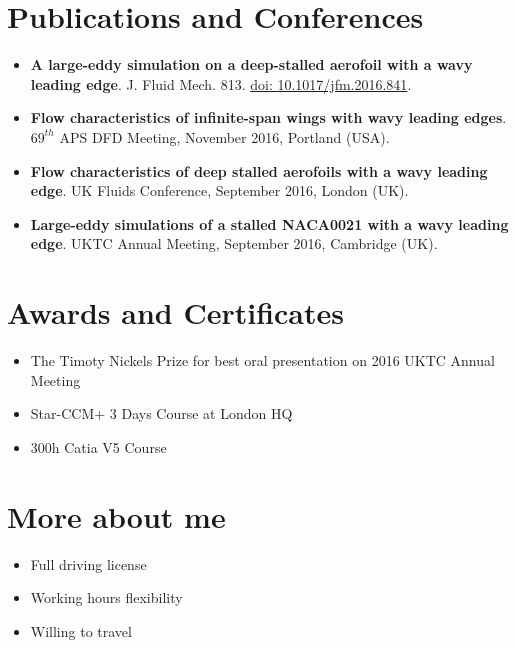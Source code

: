 \documentclass[fontsize=10pt]{tccv}
\begin{document}
\vspace{-25pt}
\section{Publications and Conferences} 
  	\begin{itemize}
	\itemsep -2pt
\item \textbf{A large-eddy simulation on a deep-stalled aerofoil with a wavy leading edge}. J. Fluid Mech. 813. \href{https://doi.org/10.1017/jfm.2016.841}{doi: 10.1017/jfm.2016.841}.
\item \textbf{Flow characteristics of infinite-span wings with wavy leading edges}. $69^{th}$ APS DFD Meeting, November 2016, Portland (USA). 
\item \textbf{Flow characteristics of deep stalled aerofoils with a wavy
leading edge}. UK Fluids Conference, September 2016, London (UK). 
\item \textbf{Large-eddy simulations of a stalled NACA0021 with a wavy
leading edge}. UKTC Annual Meeting, September 2016, Cambridge (UK).
	\end{itemize}

\vspace{-25pt}
\section{Awards and Certificates} 
  	\begin{itemize}
	\itemsep -2pt
	\item The Timoty Nickels Prize for best oral presentation on 2016 UKTC Annual Meeting
	\item Star-CCM+ 3 Days Course at London HQ
	\item 300h Catia V5 Course
	\end{itemize}

\vspace{-22pt}
\section{More about me} 
\begin{itemize}
	\itemsep -2pt
	\item Full driving license
	\item Working hours flexibility
	\item Willing to travel
\end{itemize}
\end{document}
